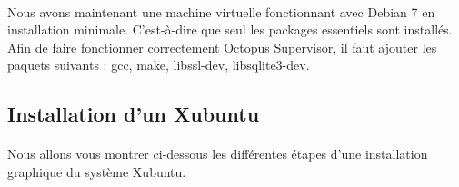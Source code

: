 \paragraph{}
Nous avons maintenant une machine virtuelle fonctionnant avec Debian 7 en installation minimale. C'est-à-dire que seul les packages essentiels sont installés. 
Afin de faire fonctionner correctement Octopus Supervisor, il faut ajouter les paquets suivants : gcc, make, libssl-dev, libsqlite3-dev.


\subsection{Installation d'un Xubuntu}
\paragraph{}
Nous allons vous montrer ci-dessous les différentes étapes d'une installation graphique du système Xubuntu.

